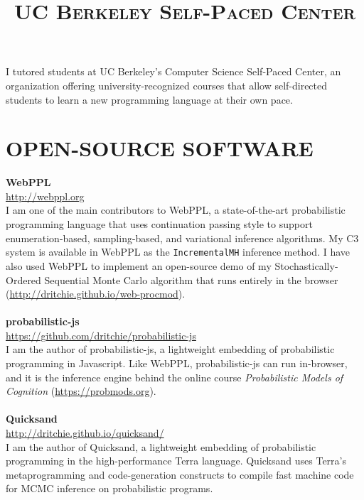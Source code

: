 \documentclass[line,margin]{res}
\begin{document}
\begin{resume}
\title{\textsc{UC Berkeley Self-Paced Center}}
\begin{position}
I tutored students at UC Berkeley's Computer Science Self-Paced Center, an organization offering university-recognized courses that allow self-directed students to learn a new programming language at their own pace.
\end{position}




\section{OPEN-SOURCE SOFTWARE}

\textbf{WebPPL} \\
\url{http://webppl.org} \\
I am one of the main contributors to WebPPL, a state-of-the-art probabilistic programming language that uses continuation passing style to support enumeration-based, sampling-based, and variational inference algorithms. My C3 system is available in WebPPL as the \texttt{IncrementalMH} inference method. I have also used WebPPL to implement an open-source demo of my Stochastically-Ordered Sequential Monte Carlo algorithm that runs entirely in the browser (\url{http://dritchie.github.io/web-procmod}).
\\ \\
\textbf{probabilistic-js} \\
\url{https://github.com/dritchie/probabilistic-js} \\
I am the author of probabilistic-js, a lightweight embedding of probabilistic programming in Javascript. Like WebPPL, probabilistic-js can run in-browser, and it is the inference engine behind the online course \emph{Probabilistic Models of Cognition} (\url{https://probmods.org}).
\\ \\
\textbf{Quicksand} \\
\url{http://dritchie.github.io/quicksand/} \\
I am the author of Quicksand, a lightweight embedding of probabilistic programming in the high-performance Terra language. Quicksand uses Terra's metaprogramming and code-generation constructs to compile fast machine code for MCMC inference on probabilistic programs.



\end{resume}
\end{document}
